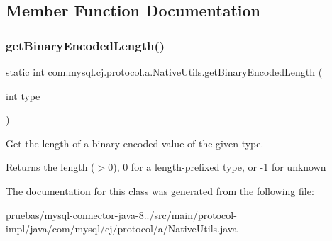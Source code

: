 \subsection{Member Function Documentation}
\mbox{\label{classcom_1_1mysql_1_1cj_1_1protocol_1_1a_1_1_native_utils_ac3519c674780b347ccf3b3e4a4c00193}} 
\subsubsection{\texorpdfstring{get\+Binary\+Encoded\+Length()}{getBinaryEncodedLength()}}
{\footnotesize\ttfamily static int com.\+mysql.\+cj.\+protocol.\+a.\+Native\+Utils.\+get\+Binary\+Encoded\+Length (\begin{DoxyParamCaption}\item[{int}]{type }\end{DoxyParamCaption})\hspace{0.3cm}{\ttfamily [static]}}

Get the length of a binary-\/encoded value of the given type.

\begin{DoxyReturn}{Returns}
the length ($>$0), 0 for a length-\/prefixed type, or -\/1 for unknown 
\end{DoxyReturn}


The documentation for this class was generated from the following file\+:\begin{DoxyCompactItemize}
\item 
pruebas/mysql-\/connector-\/java-\/8../src/main/protocol-\/impl/java/com/mysql/cj/protocol/a/Native\+Utils.\+java\end{DoxyCompactItemize}
